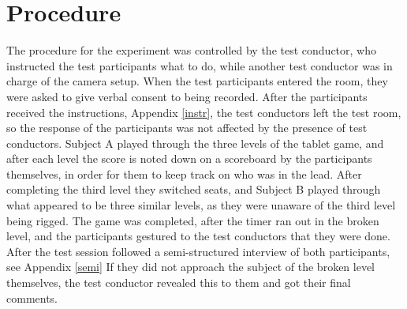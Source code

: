 \section{Procedure}
The procedure for the experiment was controlled by the test conductor, who instructed the test participants what to do, while another test conductor was in charge of the camera setup. When the test participants entered the room, they were asked to give verbal consent to being recorded. After the participants received the instructions, Appendix \ref{instr}, the test conductors left the test room, so the response of the participants was not affected by the presence of test conductors. Subject A played through the three levels of the tablet game, and after each level the score is noted down on a scoreboard by the participants themselves, in order for them to keep track on who was in the lead. After completing the third level they switched seats, and Subject B played through what appeared to be three similar levels, as they were unaware of the third level being rigged. The game was completed, after the timer ran out in the broken level, and the participants gestured to the test conductors that they were done. After the test session followed a semi-structured interview of both participants, see Appendix \ref{semi} If they did not approach the subject of the broken level themselves, the test conductor revealed this to them and got their final comments. 
